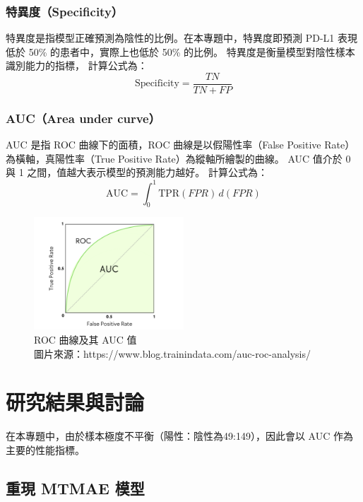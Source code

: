 \documentclass[12pt,a4paper]{article}
\begin{document}
\subsubsection{特異度（Specificity）}
特異度是指模型正確預測為陰性的比例。在本專題中，特異度即預測 PD-L1 表現低於 50\% 的患者中，實際上也低於 50\% 的比例。
特異度是衡量模型對陰性樣本識別能力的指標，
計算公式為：
\begin{equation}
\text{Specificity} = \frac{TN}{TN + FP}
\end{equation}
\subsubsection{AUC（Area under curve）}
AUC 是指 ROC 曲線下的面積，ROC 曲線是以假陽性率（False Positive Rate）為橫軸，真陽性率（True Positive Rate）為縱軸所繪製的曲線。
AUC 值介於 0 與 1 之間，值越大表示模型的預測能力越好。
計算公式為：
\begin{equation}
\text{AUC} = \int_{0}^{1} \text{TPR}(FPR) \, d(FPR)
\end{equation}

\begin{figure}[H]
  \centering
  \includegraphics[width=0.5\textwidth]{src/image3.png}
  \centering
  \caption{ROC 曲線及其 AUC 值\\圖片來源：https://www.blog.trainindata.com/auc-roc-analysis/}
  \label{fig:roc-curve}
\end{figure}






\section{研究結果與討論}
在本專題中，由於樣本極度不平衡（陽性：陰性為49:149），因此會以 AUC 作為主要的性能指標。


\subsection{重現 MTMAE 模型}
\end{document}
